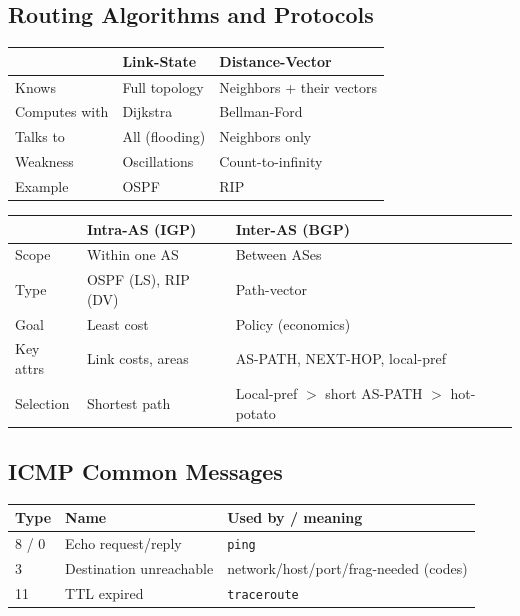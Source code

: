 \documentclass[hidelinks]{article}
\begin{document}
\subsection{Routing Algorithms and Protocols}

\noindent\begin{tabularx}{\textwidth}{|l|X|X|}
\hline
 & \textbf{Link-State} & \textbf{Distance-Vector} \\
\hline
Knows & Full topology & Neighbors + their vectors \\
\hline
Computes with & Dijkstra & Bellman-Ford \\
\hline
Talks to & All (flooding) & Neighbors only \\
\hline
Weakness & Oscillations & Count-to-infinity \\
\hline
Example & OSPF & RIP \\
\hline
\end{tabularx}

\medskip
\noindent\begin{tabularx}{\textwidth}{|l|X|X|}
\hline
 & \textbf{Intra-AS (IGP)} & \textbf{Inter-AS (BGP)} \\
\hline
Scope & Within one AS & Between ASes \\
\hline
Type & OSPF (LS), RIP (DV) & Path-vector \\
\hline
Goal & Least cost & Policy (economics) \\
\hline
Key attrs & Link costs, areas & AS-PATH, NEXT-HOP, local-pref \\
\hline
Selection & Shortest path & Local-pref $>$ short AS-PATH $>$ hot-potato \\
\hline
\end{tabularx}

\subsection{ICMP Common Messages}

\noindent\begin{tabularx}{\textwidth}{|l|l|X|}
\hline
\textbf{Type} & \textbf{Name} & \textbf{Used by / meaning} \\
\hline
8 / 0 & Echo request/reply & \texttt{ping} \\
\hline
3 & Destination unreachable & network/host/port/frag-needed (codes) \\
\hline
11 & TTL expired & \texttt{traceroute} \\
\hline
\end{tabularx}
\end{document}
